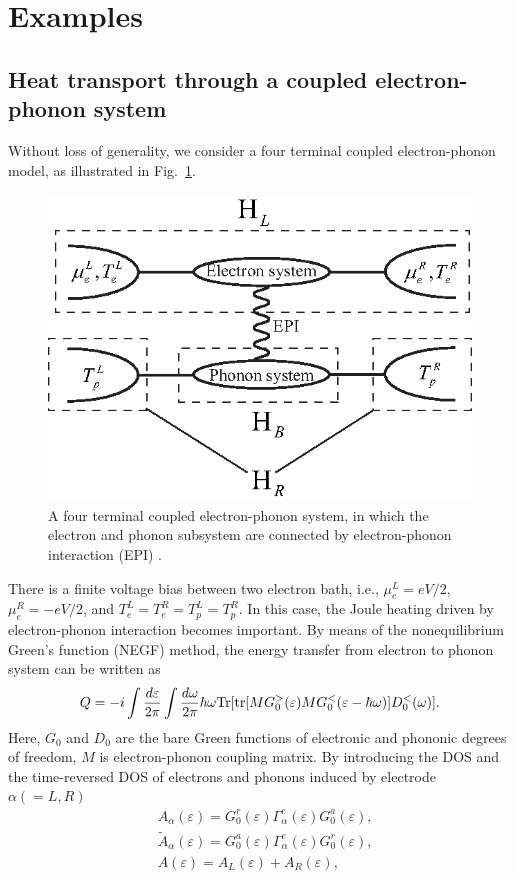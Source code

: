 \documentclass[aps
,floatfix,footinbib,
preprint
]{revtex4-1}
\begin{document}
\section{Examples}
\subsection{Heat transport through a coupled electron-phonon system}
Without loss of generality, we consider a four terminal coupled electron-phonon model, as illustrated
in Fig.~\ref{heat}.
%
\begin{figure}
\centering
\includegraphics[width=8 cm]{heat.eps}
\caption{A four terminal coupled electron-phonon system, in which the electron and phonon subsystem are connected by electron-phonon interaction (EPI) .}
\label{heat}
\end{figure}
%
There is a finite voltage bias between two electron bath, i.e., $\mu_{e}^{L}=eV/2$, $\mu_{e}^{R}=-eV/2$, and $T_{e}^{L}=T_{e}^{R}=T_{p}^{L}=T_{p}^{R}$. In this case, the Joule heating driven by electron-phonon interaction becomes important. By means of the nonequilibrium Green’s function (NEGF) method, the energy transfer from electron to phonon system can be written as\cite{lu2007coupled}
\begin{equation}
\begin{split}
Q=-i\int\frac{d \varepsilon}{2 \pi}\int\frac{d \omega}{2 \pi}\hbar\omega{\rm Tr}[{\rm tr}[MG_{0}^{>}(\varepsilon)M
G_{0}^{<}(\varepsilon-\hbar\omega)]D_{0}^{<}(\omega)].
\end{split}
\end{equation}
Here, $G_{0}$ and $D_{0}$ are the bare Green functions of electronic and phononic degrees of freedom, $M$ is electron-phonon coupling matrix. 
By introducing the DOS and the time-reversed DOS of electrons and phonons induced by electrode $\alpha(=L,R)$\cite{lu2016electron}
\begin{equation}
\begin{split}
&A_{\alpha}(\varepsilon)=G_{0}^{r}(\varepsilon)\Gamma_{\alpha}^{e}(\varepsilon)G_{0}^{a}(\varepsilon),\\
&\tilde{A}_{\alpha}(\varepsilon)=G_{0}^{a}(\varepsilon)\Gamma_{\alpha}^{e}(\varepsilon)G_{0}^{r}(\varepsilon),\\
&A(\varepsilon)=A_{L}(\varepsilon)+A_{R}(\varepsilon),
\end{split}
\end{equation}
\end{document}
